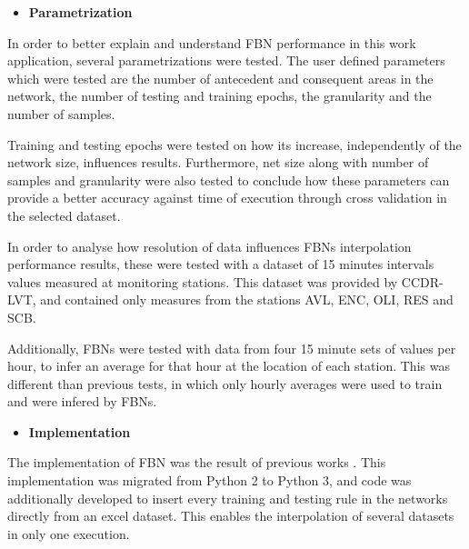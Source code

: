 \begin{itemize}[leftmargin=0.0mm]
  \item[] \textbf{Parametrization}
\end{itemize}

\noindent
In order to better explain and understand FBN performance in this work application, several parametrizations were tested.
The user defined parameters which were tested are the number of antecedent and consequent areas in the network, the number of testing and training epochs, the granularity and the number of samples.

Training and testing epochs were tested on how its increase, independently of the network size, influences results. Furthermore, net size along with number of samples and granularity were also tested to conclude how these parameters can provide a better accuracy against time of execution through cross validation in the selected dataset.

In order to analyse how resolution of data influences FBNs interpolation performance results, these were tested with a dataset of 15 minutes intervals values measured at monitoring stations. This dataset was provided by CCDR-LVT, and contained only measures from the stations AVL, ENC, OLI, RES and SCB.

Additionally, FBNs were tested with data from four 15 minute sets of values per hour, to infer an average for that hour at the location of each station. This was different than previous tests, in which only hourly averages were used to train and were infered by FBNs.



\begin{itemize}[leftmargin=0.0mm]
  \item[] \textbf{Implementation}
\end{itemize}

\noindent
The implementation of FBN was the result of previous works \cite{Tome2014}. This implementation was migrated from Python 2 to Python 3, and code was additionally developed to insert every training and testing rule in the networks directly from an excel dataset. This enables the interpolation of several datasets in only one execution.

